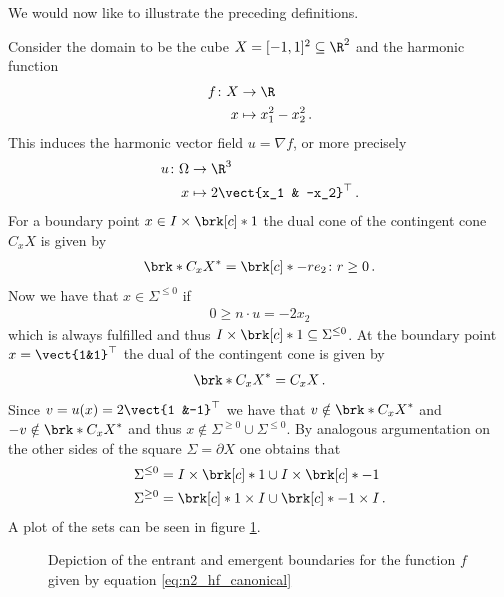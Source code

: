 We would now like to illustrate the preceding definitions.
\begin{example}\label{ex:n2_hvf_canonical}
  Consider the domain to be the cube $X=[-1,1]^2\subseteq\R^2$
  and the harmonic function
  \begin{equation}
    \begin{aligned}
    f\colon X&\to\R \\
    x&\mapsto x_1^2-x_2^2\,.\label{eq:n2_hf_canonical}
    \end{aligned}
  \end{equation}
  This induces the harmonic vector field $u=\nabla f$, or more precisely
  \begin{equation}
    \begin{aligned}
    u\colon \Omega&\to\R^3 \\
    x&\mapsto 2\vect{x_1 & -x_2}^\top\,.\label{eq:n2_hvf_canonical}
    \end{aligned}
  \end{equation}
  For a boundary point $x\in I\times\brk[c]*{1}$ the dual cone of the contingent cone
  $C_xX$ is given by
  \begin{align*}
    \brk*{C_xX}^*=\brk[c]*{-r e_2\colon r\geq0}\,.
  \end{align*}
  Now we have that $x\in\Sigma^{\leq0}$ if
  \begin{align*}
    0\geq n\cdot u = -2x_2
  \end{align*}
  which is always fulfilled and thus $I\times\brk[c]*{1}\subseteq\Sigma^{\leq0}$.
  At the boundary point $x=\vect{1&1}^\top$ the dual of the contingent cone is given by
  \begin{align*}
    \brk*{C_xX}^*=C_xX\,.
  \end{align*}
  Since $v=u(x)=2\vect{1 &-1}^\top$ we have that $v\notin\brk*{C_xX}^*$ and $-v\notin\brk*{C_xX}^*$
  and thus $x\notin\Sigma^{\geq0}\cup\Sigma^{\leq0}$.
  By analogous argumentation on the other sides of the square $\Sigma=\partial X$
  one obtains that
  \begin{align*}
    \Sigma^{\leq0}&=I\times\brk[c]*{1}\cup I\times\brk[c]*{-1}\\
    \Sigma^{\geq0}&=\brk[c]*{1}\times I\cup \brk[c]*{-1}\times I\,.
  \end{align*}
  A plot of the sets can be seen in figure \ref{pl:n2_hvf_canonical_boundary}.
  \begin{figure}
    \centering
    
    \caption{Depiction of the entrant and emergent boundaries for the
      function $f$ given by equation \eqref{eq:n2_hf_canonical}}
    \label{pl:n2_hvf_canonical_boundary}
  \end{figure}
\end{example}

